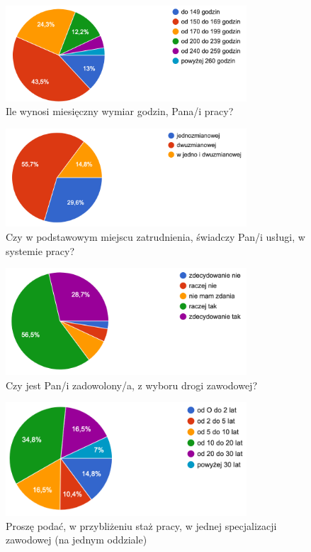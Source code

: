 \documentclass[a4paper,12pt,twoside,openany]{report}
\begin{document}
\begin{figure}
    \includegraphics[width=9cm]{wyniki/03_wymiar_godzin}
    \caption{Ile wynosi miesięczny wymiar godzin, Pana/i pracy?}
    \label{rys:ile_godzin}
\end{figure}

\begin{figure}
    \includegraphics[width=9cm]{wyniki/04_ile_zmian}
    \caption{Czy w podstawowym miejscu zatrudnienia, świadczy  Pan/i usługi, w systemie pracy?}
    \label{rys:ile_zmian}
\end{figure}

\begin{figure}
    \includegraphics[width=9cm]{wyniki/05_zadowol}
    \caption{Czy jest Pan/i zadowolony/a, z wyboru drogi zawodowej?}
    \label{rys:zadowol}
\end{figure}

\begin{figure}
    \includegraphics[width=9cm]{wyniki/06_staz_w_spec}
    \caption{Proszę podać, w przybliżeniu staż pracy, w jednej specjalizacji zawodowej (na jednym oddziale)}
    \label{rys:staz_spec}
\end{figure}
\end{document}
